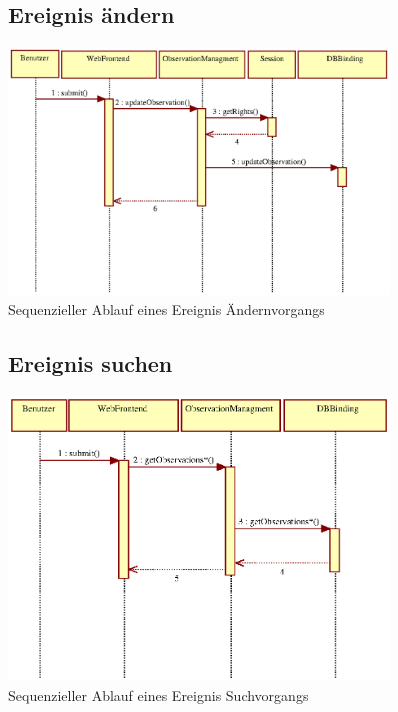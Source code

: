 \documentclass[a4paper,11pt]{scrartcl}
\begin{document}
\begin{figure}[htbp]
\subsection{Ereignis ändern}
		\centering
		\includegraphics[width=0.90\textwidth]{images/seq11_EreignisAendern.eps}
		\caption{Sequenzieller Ablauf eines Ereignis Ändernvorgangs}
		\label{seq11}
\end{figure}



\begin{figure}[htbp]
\subsection{Ereignis suchen}
		\centering
		\includegraphics[width=0.90\textwidth]{images/seq12_EreignisSuchen.eps}
		\caption{Sequenzieller Ablauf eines Ereignis Suchvorgangs}
		\label{seq12}
\end{figure}
\end{document}
